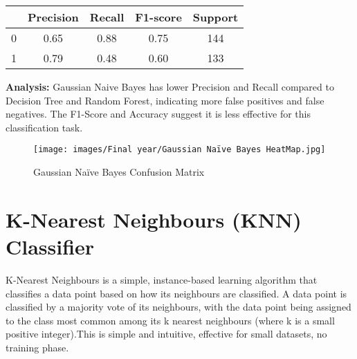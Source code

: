 \documentclass{report}
\begin{document}
{\begin{center}
\begin{tabular}{|c|c|c|c|c|}
  \hline
   & Precision & Recall & F1-score & Support \\
  \hline
  0 & 0.65 & 0.88 & 0.75 & 144 \\
  1 & 0.79 & 0.48 & 0.60 & 133 \\
  \hline
\end{tabular}
\end{center}
\textbf{Analysis: } Gaussian Naive Bayes has lower Precision and Recall compared to Decision Tree and Random Forest, indicating more false positives and false negatives. The F1-Score and Accuracy suggest it is less effective for this classification task.
\vspace{1cm}
    \begin{figure}[h!]
    \centering
        \texttt{[image: images/Final year/Gaussian Naïve Bayes HeatMap.jpg]} %
        \caption{Gaussian Naïve Bayes Confusion Matrix}
    \end{figure}
\section{K-Nearest Neighbours (KNN) Classifier}
K-Nearest Neighbours is a simple, instance-based learning algorithm that classifies a data point based on how its neighbours are classified. A data point is classified by a majority vote of its neighbours, with the data point being assigned to the class most common among its k nearest neighbours (where k is a small positive integer).This is simple and intuitive, effective for small datasets, no training phase.

}
\end{document}
